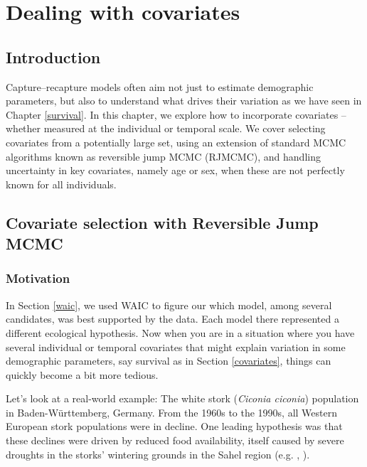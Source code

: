 \documentclass[
  12pt,
]{krantz}
\begin{document}
\chapter{Dealing with covariates}\label{covariateschapter}

\section{Introduction}\label{introduction-8}

Capture--recapture models often aim not just to estimate demographic parameters, but also to understand what drives their variation as we have seen in Chapter \ref{survival}. In this chapter, we explore how to incorporate covariates -- whether measured at the individual or temporal scale. We cover selecting covariates from a potentially large set, using an extension of standard MCMC algorithms known as reversible jump MCMC (RJMCMC), and handling uncertainty in key covariates, namely age or sex, when these are not perfectly known for all individuals.

\section{Covariate selection with Reversible Jump MCMC}\label{covariate-selection-with-reversible-jump-mcmc}

\subsection{Motivation}\label{motivation}

In Section \ref{waic}, we used WAIC to figure our which model, among several candidates, was best supported by the data. Each model there represented a different ecological hypothesis. Now when you are in a situation where you have several individual or temporal covariates that might explain variation in some demographic parameters, say survival as in Section \ref{covariates}, things can quickly become a bit more tedious.

Let's look at a real-world example: The white stork (\emph{Ciconia ciconia}) population in Baden-Württemberg, Germany. From the 1960s to the 1990s, all Western European stork populations were in decline. One leading hypothesis was that these declines were driven by reduced food availability, itself caused by severe droughts in the storks' wintering grounds in the Sahel region (e.g. \citet{kanya90}, \citet{grosbois_assessing_2008}).
\end{document}

